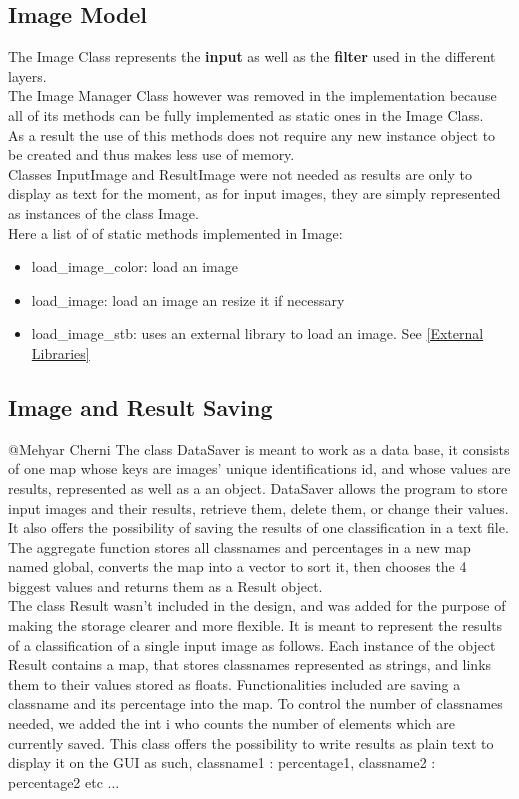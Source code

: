 \documentclass[parskip=full]{scrartcl}
\newcommand\tab[1][1cm]{\hspace*{#1}}
\begin{document}
	\subsection {Image Model}
	\tab The Image Class represents the \textbf{input} as well as the \textbf{filter} used in the different layers.\\
	The Image Manager Class however was removed in the implementation because all of its methods can be fully implemented as static ones in the Image Class.\\ As a result the use of this methods does not require any new instance object to be created and thus makes less use of memory. \\ Classes InputImage and ResultImage were not needed as results are only to display as text for the moment, as for input images, they are simply represented as instances of the class Image.\\ Here a list of of static methods implemented in Image:
	\begin {itemize}
		\item load\_image\_color: load an image
		\item load\_image: load an image an resize it if necessary
		\item load\_image\_stb: uses an external library to load an image. See \ref{External Libraries}
	\end{itemize}
	\subsection {Image and Result Saving}
	@Mehyar Cherni
	\tab The class DataSaver is meant to work as a data base, it consists of one map whose keys are images' unique identifications id, and whose values are results, represented as well as a an object. DataSaver allows the program to store input images and their results, retrieve them, delete them, or change their values. It also offers the possibility of saving the results of one classification in a text file. \\The aggregate function stores all classnames and percentages in a new map named global, converts the map into a vector to sort it, then chooses the 4 biggest values and returns them as a Result object.
\\The class Result wasn't included in the design, and was added for the purpose of making the storage clearer and more flexible. It is meant to represent the results of a classification of a single input image as follows. Each instance of the object Result contains a map, that stores classnames represented as strings, and links them to their values stored as floats. Functionalities included are saving a classname and its percentage into the map. To control the number of classnames needed, we added the int i who counts the number of elements which are currently saved. This class offers the possibility to write results as plain text to display it on the GUI as such, classname1 : percentage1, classname2 : percentage2 etc ... 
\end{document}
